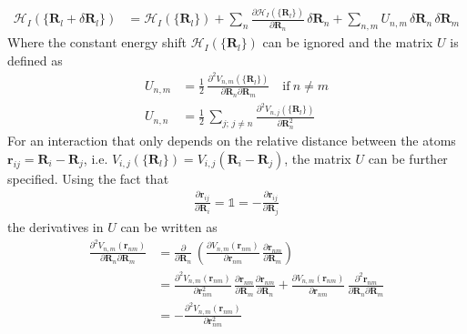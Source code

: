 \begin{align*}
    \mathcal{H}_I(\{\mathbf{R}_l+\delta\mathbf{R}_l\})&=\mathcal{H}_I(\{\mathbf{R}_l\})+\sum_n\frac{\partial \mathcal{H}_I(\{\mathbf{R}_l\})}{\partial \mathbf{R}_n}\,\delta\mathbf{R}_n + \sum_{n,m}U_{n,m}\,\delta\mathbf{R}_n\,\delta\mathbf{R}_m
\end{align*}
Where the constant energy shift $\mathcal{H}_I(\{\mathbf{R}_l\})$ can be ignored and the matrix $U$ is defined as
\begin{align*}
    U_{n,m}&=
        \frac12\,\frac{\partial^2 V_{n,m}(\{\mathbf{R}_l\})}{\partial \mathbf{R}_n\partial\mathbf{R}_m}\quad\text{if}\:n\neq m\\
    U_{n,n} &= \frac12\,\sum_{j;\,j\neq n}\frac{\partial^2 V_{n,j}(\{\mathbf{R}_l\})}{\partial \mathbf{R}_n^2}
\end{align*}
For an interaction that only depends on the relative distance between the atoms $\mathbf{r}_{ij}=\mathbf{R}_i-\mathbf{R}_j$, i.e. $V_{i,j}(\{\mathbf{R}_l\})=V_{i,j}(\mathbf{R}_i-\mathbf{R}_j)$, the matrix $U$ can be further specified. Using the fact that
\begin{align*}
    \frac{\partial \mathbf{r}_{ij}}{\partial \mathbf{R}_i}=\mathbb{1}=-\frac{\partial \mathbf{r}_{ij}}{\partial \mathbf{R}_j}
\end{align*}
the derivatives in $U$ can be written as 
\begin{align*}
    \frac{\partial^2 V_{n,m}(\mathbf{r}_{nm})}{\partial \mathbf{R}_n\partial\mathbf{R}_m}&=\frac{\partial}{\partial  \mathbf{R}_n }\,\left( \frac{\partial V_{n,m}(\mathbf{r}_{nm})}{\partial\mathbf{r}_{nm}}\,  \frac{\partial \mathbf{r}_{nm}}{\partial\mathbf{R}_{m}}\right)\\
    &= \frac{\partial^2 V_{n,m}(\mathbf{r}_{nm})}{\partial\mathbf{r}_{nm}^2}\,  \frac{\partial \mathbf{r}_{nm}}{\partial\mathbf{R}_{m}}\frac{\partial \mathbf{r}_{nm}}{\partial\mathbf{R}_{n}}+\frac{\partial V_{n,m}(\mathbf{r}_{nm})}{\partial\mathbf{r}_{nm}}\,  \frac{\partial^2 \mathbf{r}_{nm}}{\partial\mathbf{R}_{n}\partial\mathbf{R}_{m}}\\
    &=-\frac{\partial^2 V_{n,m}(\mathbf{r}_{nm})}{\partial\mathbf{r}_{nm}^2}
\end{align*}
